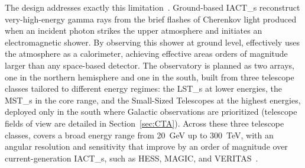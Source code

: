 The \CTAO design addresses exactly this limitation~\cite{CTAConsortium:2017dvg}.
Ground-based \glspl{IACT_} reconstruct very-high-energy gamma rays from the brief flashes of Cherenkov light produced when an incident photon strikes the upper atmosphere and initiates an electromagnetic shower.
By observing this shower at ground level, \CTAO effectively uses the atmosphere as a calorimeter, achieving effective areas orders of magnitude larger than any space-based detector.
The observatory is planned as two arrays, one in the northern hemisphere and one in the south, built from three telescope classes tailored to different energy regimes: the \glspl{LST_} at lower energies, the \glspl{MST_} in the core range, and the Small-Sized Telescopes at the highest energies, deployed only in the south where Galactic observations are prioritized (telescope fields of view are detailed in Section~\ref{sec:CTA}).
Across these three telescope classes, \CTAO covers a broad energy range from 20~GeV up to 300~TeV, with an angular resolution and sensitivity that improve by an order of magnitude over current-generation \glspl{IACT_}, such as HESS, MAGIC, and VERITAS~\cite{CTAConsortium:2017dvg}.

